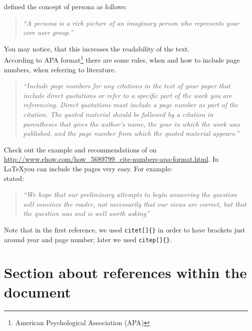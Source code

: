 \documentclass[a4paper]{article}
\begin{document}
\cite{Dix04} defined the concept of persona as follows: 
\begin{quotation}
	\emph{``A persona is a rich picture of an imaginary person who represents your core user group.''}
	\citep{Dix04}
\end{quotation}

You may notice, that this increases the readability of the text. \\

According to APA format\footnote{ American Psychological Association (APA)} there are some rules, when and how to include page numbers, when referring to literature. 

\begin{quotation}
	\emph{``Include page numbers for any citations in the text of your paper that include direct quotations or refer to a specific part of the work you are referencing. Direct quotations must include a page number as part of the citation. The quoted material should be followed by a citation in parentheses that gives the author's name, the year in which the work was published, and the page number from which the quoted material appears.''}
	\citep{Hall}
\end{quotation}

Check out the example and recommendations of \cite{Hall} on \url{http://www.ehow.com/how_5689799_cite-numbers-apa-format.html}. In \LaTeX you can include the pages very easy. For example: \\

\citet[p. 86]{Baddeley:1974ts} stated: 

\begin{quotation}
	\emph{``We hope that our preliminary attempts to begin answering the question will convince the reader, not necessarily that our views are correct, but that the question was and is well worth asking''}
	\citep[p. 86]{Baddeley:1974ts}
\end{quotation}

Note that in the first reference, we used \texttt{citet[]\{\}} in order to have brackets just around year and page number; later we used \texttt{citep[]\{\}}.



\section{Section about references within the document} %
\label{sec:section_about_references_within_the_document}
\end{document}
